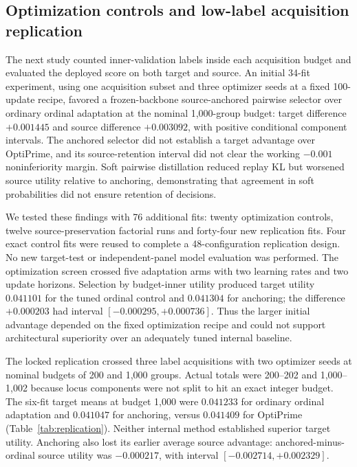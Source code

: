\subsection{Optimization controls and low-label acquisition replication}
\label{sec:suplowlabel}
The next study counted inner-validation labels inside each acquisition budget and evaluated the deployed score on both target and source. An initial 34-fit experiment, using one acquisition subset and three optimizer seeds at a fixed 100-update recipe, favored a frozen-backbone source-anchored pairwise selector over ordinary ordinal adaptation at the nominal 1,000-group budget: target difference $+0.001445$ and source difference $+0.003092$, with positive conditional component intervals. The anchored selector did not establish a target advantage over OptiPrime, and its source-retention interval did not clear the working $-0.001$ noninferiority margin. Soft pairwise distillation reduced replay KL but worsened source utility relative to anchoring, demonstrating that agreement in soft probabilities did not ensure retention of decisions.

We tested these findings with 76 additional fits: twenty optimization controls, twelve source-preservation factorial runs and forty-four new replication fits. Four exact control fits were reused to complete a 48-configuration replication design. No new target-test or independent-panel model evaluation was performed. The optimization screen crossed five adaptation arms with two learning rates and two update horizons. Selection by budget-inner utility produced target utility $0.041101$ for the tuned ordinal control and $0.041304$ for anchoring; the difference $+0.000203$ had interval $[-0.000295,+0.000736]$. Thus the larger initial advantage depended on the fixed optimization recipe and could not support architectural superiority over an adequately tuned internal baseline.

The locked replication crossed three label acquisitions with two optimizer seeds at nominal budgets of 200 and 1,000 groups. Actual totals were 200--202 and 1,000--1,002 because locus components were not split to hit an exact integer budget. The six-fit target means at budget 1,000 were $0.041233$ for ordinary ordinal adaptation and $0.041047$ for anchoring, versus $0.041409$ for OptiPrime (Table~\ref{tab:replication}). Neither internal method established superior target utility. Anchoring also lost its earlier average source advantage: anchored-minus-ordinal source utility was $-0.000217$, with interval $[-0.002714,+0.002329]$.

